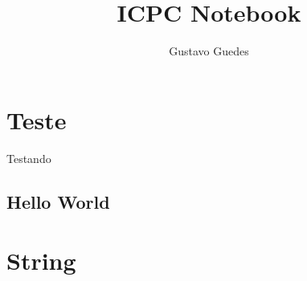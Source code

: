 \documentclass[a4paper, 10pt,twoside]{article}
\title{ICPC Notebook}
\author{Gustavo Guedes}
\newcommand\includes[2]{
   \subsection{#1}
   
}
\begin{document}
	\maketitle
	\begin{multicols*}{2}
		\tableofcontents
		\thispagestyle{fancy}
		
		\section{Teste}
			Testando
			\includes{Hello World}{code/helloworld.cpp}
		\section{String}
			
		
	\end{multicols*}
\end{document}
